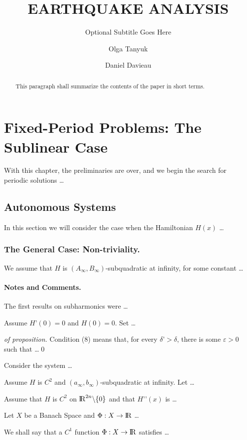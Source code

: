 \documentclass[]{llncs}
\title{EARTHQUAKE ANALYSIS}
\subtitle{Optional Subtitle Goes Here}
\author{Olga Tanyuk\inst{1} \and Daniel Davieau\inst{2}}
\institute{Southern Methodist University, Dallas TX 75205, USA}
\begin{document}
\maketitle
%
\begin{abstract}
This paragraph shall summarize the contents of the paper in short terms. \end{abstract}
%
\section{Fixed-Period Problems: The Sublinear Case}
%
With this chapter, the preliminaries are over, and we begin the search for periodic solutions \dots
%
\subsection{Autonomous Systems}
%
In this section we will consider the case when the Hamiltonian $H(x)$ \dots
%
\subsubsection*{The General Case: Non-triviality.}
%
We assume that $H$ is $\left(A_{\infty}, B_{\infty}\right)$-subqua\-dra\-tic at infinity, for some constant \dots
%
\paragraph{Notes and Comments.} The first results on subharmonics were \dots
%
\begin{proposition} Assume $H’(0)=0$ and $ H(0)=0$. Set \dots \end{proposition} \begin{proof}[of proposition] Condition (8) means that, for every $\delta’>\delta$, there is some $\varepsilon>0$ such that \dots \qed \end{proof} 
%
\begin{example} Consider the system \dots \end{example}
\begin{corollary} Assume $H$ is $C^{2}$ and $\left(a_{\infty}, b_{\infty}\right)$-subquadratic at infinity. Let \dots \end{corollary}
\begin{lemma} Assume that $H$ is $C^{2}$ on ${\rm I\!R}^{2n}\backslash \{0\}$ and that $H’’(x)$ is \dots \end{lemma}
\begin{theorem} Let $X$ be a Banach Space and $\Phi:X\to{\rm I\!R}$ \dots
\end{theorem}
\begin{definition} We shall say that a $C^{1}$ function $\Phi:X\to{\rm I\!R}$ satisfies \dots \end{definition}
\end{document}
